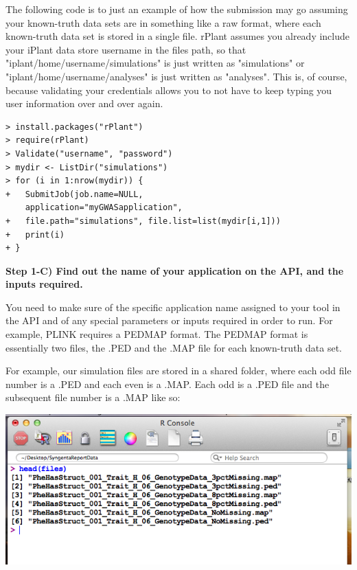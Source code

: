 \documentclass[twoside,a4paper]{refart}
\begin{document}
The following code is to just an example of how the submission may go assuming your known-truth data sets are in something like a raw format, where each known-truth data set is stored in a single file. rPlant assumes you already include your iPlant data store username in the files path, so that "iplant/home/username/simulations" is just written as "simulations" or "iplant/home/username/analyses" is just written as "analyses". This is, of course, because validating your credentials allows you to not have to keep typing you user information over and over again. 


\begin{lstlisting}[frame=single]
> install.packages("rPlant")
> require(rPlant)
> Validate("username", "password")
> mydir <- ListDir("simulations")
> for (i in 1:nrow(mydir)) {
+	SubmitJob(job.name=NULL,
	application="myGWASapplication", 
+	file.path="simulations", file.list=list(mydir[i,1]))
+	print(i)
+ }
\end{lstlisting} 

\textbf{Step 1-C) Find out the name of your application on the API, and the inputs required.} 

\vspace{-1mm}

You need to make sure of the specific application name assigned to your tool in the API and of any special parameters or inputs required in order to run. For example, PLINK requires a PEDMAP format. The PEDMAP format is essentially two files, the .PED and the .MAP file for each known-truth data set. 

For example, our simulation files are stored in a shared folder, where each odd file number is a .PED and each even is a .MAP. Each odd is a .PED file and the subsequent file number is a .MAP like so:
\begin{center}
	\includegraphics[width=\textwidth]{doc_step1_2}
\end{center}
\end{document}
